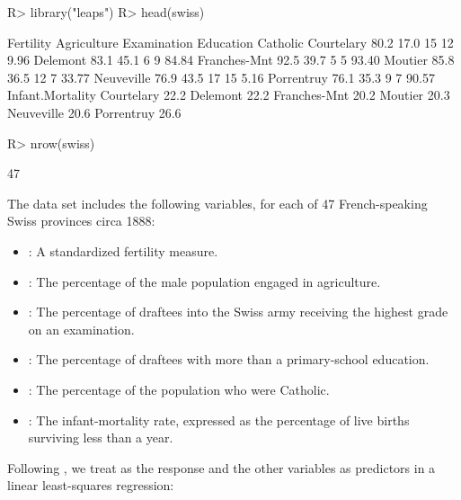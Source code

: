 \documentclass[
]{jss}
\providecommand{\tightlist}{%
  \setlength{\itemsep}{0pt}\setlength{\parskip}{0pt}}
\begin{document}
\begin{CodeChunk}
\begin{CodeInput}
R> library("leaps")
R> head(swiss)
\end{CodeInput}
\begin{CodeOutput}
             Fertility Agriculture Examination Education Catholic
Courtelary        80.2        17.0          15        12     9.96
Delemont          83.1        45.1           6         9    84.84
Franches-Mnt      92.5        39.7           5         5    93.40
Moutier           85.8        36.5          12         7    33.77
Neuveville        76.9        43.5          17        15     5.16
Porrentruy        76.1        35.3           9         7    90.57
             Infant.Mortality
Courtelary               22.2
Delemont                 22.2
Franches-Mnt             20.2
Moutier                  20.3
Neuveville               20.6
Porrentruy               26.6
\end{CodeOutput}
\begin{CodeInput}
R> nrow(swiss)
\end{CodeInput}
\begin{CodeOutput}
[1] 47
\end{CodeOutput}
\end{CodeChunk}

The data set includes the following variables, for each of 47
French-speaking Swiss provinces circa 1888:

\begin{itemize}
\tightlist
\item
  : A standardized fertility measure.
\item
  : The percentage of the male population engaged in
  agriculture.
\item
  : The percentage of draftees into the Swiss army
  receiving the highest grade on an examination.
\item
  : The percentage of draftees with more than a
  primary-school education.
\item
  : The percentage of the population who were Catholic.
\item
  : The infant-mortality rate, expressed as the
  percentage of live births surviving less than a year.
\end{itemize}

Following \citet{LumleyMiller:2020}, we treat  as the
response and the other variables as predictors in a linear least-squares
regression:
\end{document}
